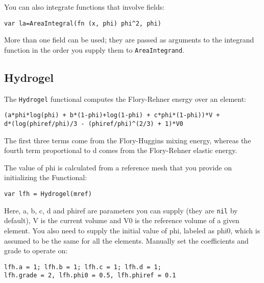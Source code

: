 You can also integrate functions that involve fields:

\begin{lstlisting}
var la=AreaIntegral(fn (x, phi) phi^2, phi)
\end{lstlisting}

More than one field can be used; they are passed as arguments to the
integrand function in the order you supply them to
\texttt{AreaIntegrand}.

\hypertarget{hydrogel}{%
\subsection{Hydrogel}\label{hydrogel}}

The \texttt{Hydrogel} functional computes the Flory-Rehner energy over
an element:

\begin{lstlisting}
(a*phi*log(phi) + b*(1-phi)+log(1-phi) + c*phi*(1-phi))*V + 
d*(log(phiref/phi)/3 - (phiref/phi)^(2/3) + 1)*V0
\end{lstlisting}

The first three terms come from the Flory-Huggins mixing energy, whereas
the fourth term proportional to d comes from the Flory-Rehner elastic
energy.

The value of phi is calculated from a reference mesh that you provide on
initializing the Functional:

\begin{lstlisting}
var lfh = Hydrogel(mref)
\end{lstlisting}

Here, a, b, c, d and phiref are parameters you can supply (they are
\texttt{nil} by default), V is the current volume and V0 is the
reference volume of a given element. You also need to supply the initial
value of phi, labeled as phi0, which is assumed to be the same for all
the elements. Manually set the coefficients and grade to operate on:

\begin{lstlisting}
lfh.a = 1; lfh.b = 1; lfh.c = 1; lfh.d = 1;
lfh.grade = 2, lfh.phi0 = 0.5, lfh.phiref = 0.1
\end{lstlisting}
